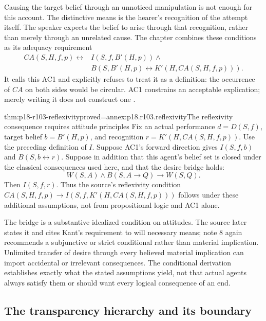 Causing the target belief through an unnoticed manipulation is not
enough for this account. The distinctive means is the hearer's recognition
of the attempt itself. The speaker expects the belief to arise through
that recognition, rather than merely through an unrelated cause.
The chapter combines these conditions as its adequacy requirement
\[
\begin{split}
 CA(S,H,f,p)\leftrightarrow{}&I(S,f,B'(H,p))\land\\
 &B(S,B'(H,p)\leftrightarrow K'(H,CA(S,H,f,p))).
\end{split}
\]
It calls this AC1 and explicitly refuses to treat it as a definition:
the occurrence of \(CA\) on both sides would be circular. AC1 constrains
an acceptable explication; merely writing it does not construct one
\cite[pp.~602--603]{Meggle2021RationalityCommunication}.

\begin{hbtheorem}{thm:p18-r103-reflexivity}{proved=annex:p18.r103.reflexivity}{The reflexivity consequence requires attitude principles}
Fix an actual performance \(d=D(S,f)\), target belief
\(b=B'(H,p)\), and recognition \(r=K'(H,CA(S,H,f,p))\).
Use the preceding definition of \(I\). Suppose AC1's forward direction
gives \(I(S,f,b)\) and \(B(S,b\leftrightarrow r)\).
Suppose in addition that this agent's belief set is closed under the
classical consequences used here, and that the desire bridge holds:
\[
 W(S,A)\land B(S,A\to Q)\to W(S,Q).
\]
Then \(I(S,f,r)\). Thus the source's reflexivity condition
\(CA(S,H,f,p)\to I(S,f,K'(H,CA(S,H,f,p)))\) follows under these
additional assumptions, not from propositional logic and AC1 alone.
\end{hbtheorem}

The bridge is a substantive idealized condition on attitudes. The source
later states it and cites Kant's requirement to will necessary means;
note 8 again recommends a subjunctive or strict conditional rather than
material implication. Unlimited transfer of desire through every believed
material implication can import accidental or irrelevant consequences.
The conditional derivation establishes exactly what the stated assumptions
yield, not that actual agents always satisfy them or should want every
logical consequence of an end.

\subsection{The transparency hierarchy and its boundary}

